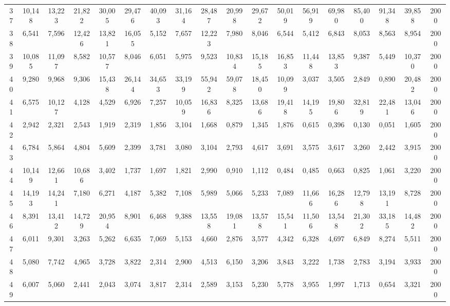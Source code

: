 {\begin{longtable}{ >{\tiny}cccccccccccccccccc}
37  & 10,148 & 13,223 & 21,822 & 30,005 & 29,476 & 40,093 & 31,164 & 28,487 & 20,998 & 29,672 & 50,019 & 56,919  & 69,980  & 85,400  & 91,348  & 39,858  & 2000 \\
38  & 6,541  & 7,596  & 12,426 & 13,821 & 16,055 & 5,152  & 7,657  & 12,223 & 7,980  & 8,046  & 6,544  & 5,412   & 6,843   & 8,053   & 8,563   & 8,954   & 2000 \\
39  & 10,085 & 11,097 & 8,582  & 10,577 & 8,046  & 6,051  & 5,975  & 9,523  & 10,834 & 15,185 & 16,853 & 11,448  & 13,853  & 9,387   & 5,449   & 10,370  & 2000 \\
40  & 9,280  & 9,968  & 9,306  & 15,438 & 26,144 & 34,653 & 33,199 & 55,942 & 59,078 & 18,450 & 10,099 & 3,037   & 3,505   & 2,849   & 0,890   & 20,482  & 2000 \\
41  & 6,575  & 10,127 & 4,128  & 4,529  & 6,926  & 7,257  & 10,059 & 16,836 & 8,325  & 13,686 & 19,418 & 14,195  & 19,806  & 32,819  & 22,481  & 13,046  & 2000 \\
42  & 2,942  & 2,321  & 2,543  & 1,919  & 2,319  & 1,856  & 3,104  & 1,668  & 0,879  & 1,345  & 1,876  & 0,615   & 0,396   & 0,130   & 0,051   & 1,605   & 2000 \\
43  & 6,784  & 5,864  & 4,804  & 5,609  & 2,399  & 3,781  & 3,080  & 3,104  & 2,793  & 4,617  & 3,691  & 3,575   & 3,617   & 3,260   & 2,442   & 3,915   & 2000 \\
44  & 10,149 & 12,661 & 10,686 & 3,402  & 1,737  & 1,697  & 1,821  & 2,990  & 0,910  & 1,112  & 0,484  & 0,485   & 0,663   & 0,825   & 1,061   & 3,220   & 2000 \\
45  & 14,193 & 14,241 & 7,180  & 6,271  & 4,187  & 5,382  & 7,108  & 5,989  & 5,066  & 5,233  & 7,089  & 11,666  & 16,286  & 12,798  & 13,191  & 8,728   & 2000 \\
46  & 8,391  & 13,412 & 14,729 & 20,954 & 8,901  & 6,468  & 9,388  & 13,558 & 19,081 & 13,578 & 15,541 & 11,506  & 13,548  & 21,302  & 33,185  & 14,482  & 2000 \\
47  & 6,011  & 9,301  & 3,263  & 5,262  & 6,635  & 7,069  & 5,153  & 4,660  & 2,876  & 3,577  & 4,342  & 6,328   & 4,697   & 6,849   & 8,274   & 5,511   & 2000 \\
48  & 5,080  & 7,742  & 4,965  & 3,728  & 3,822  & 2,314  & 2,900  & 4,513  & 6,150  & 3,206  & 3,843  & 3,222   & 1,738   & 2,783   & 3,194   & 3,933   & 2000 \\
49  & 6,007  & 5,060  & 2,441  & 2,043  & 3,074  & 3,817  & 2,314  & 2,589  & 3,153  & 5,230  & 5,778  & 3,955   & 1,997   & 1,713   & 0,654   & 3,321   & 2000 \\

\end{longtable}}
